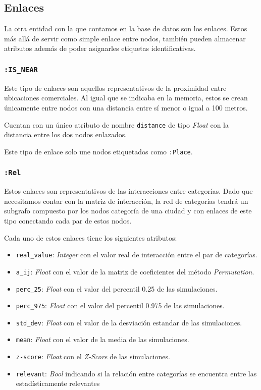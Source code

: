 \subsection{Enlaces}
La otra entidad con la que contamos en la base de datos son los enlaces. Estos más allá de servir como simple enlace entre nodos, también pueden almacenar atributos además de poder asignarles etiquetas identificativas.

\subsubsection{\texttt{:IS\_NEAR}}
Este tipo de enlaces son aquellos representativos de la proximidad entre ubicaciones comerciales. Al igual que se indicaba en la memoria, estos se crean únicamente entre nodos con una distancia entre sí menor o igual a 100 metros.

Cuentan con un único atributo de nombre \texttt{distance} de tipo \textit{Float} con la distancia entre los dos nodos enlazados.

Este tipo de enlace solo une nodos etiquetados como \texttt{:Place}.

\subsubsection{\texttt{:Rel}}
Estos enlaces son representativos de las interacciones entre categorías. Dado que necesitamos contar con la matriz de interacción, la red de categorías tendrá un subgrafo compuesto por los nodos categoría de una ciudad y con enlaces de este tipo conectando cada par de estos nodos.

Cada uno de estos enlaces tiene los siguientes atributos:
\begin{itemize}
	\item \texttt{real\_value}: \textit{Integer} con el valor real de interacción entre el par de categorías.
	\item \texttt{a\_ij}: \textit{Float} con el valor de la matriz de coeficientes del método \textit{Permutation}.
	\item \texttt{perc\_25}: \textit{Float} con el valor del percentil 0.25 de las simulaciones.
	\item \texttt{perc\_975}: \textit{Float} con el valor del percentil 0.975 de las simulaciones.
	\item \texttt{std\_dev}: \textit{Float} con el valor de la desviación estandar de las simulaciones.
	\item \texttt{mean}: \textit{Float} con el valor de la media de las simulaciones.
	\item \texttt{z-score}: \textit{Float} con el \textit{Z-Score} de las simulaciones.
	\item \texttt{relevant}: \textit{Bool} indicando si la relación entre categorías se encuentra entre las estadísticamente relevantes
\end{itemize}

